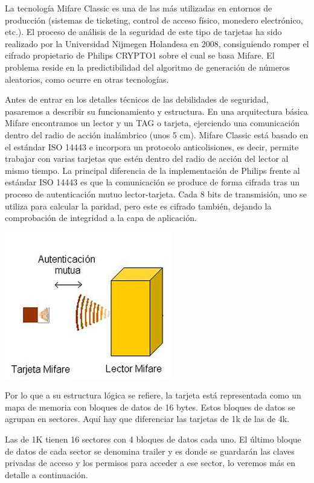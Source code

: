 La tecnología Mifare Classic es una de las más utilizadas en entornos de
producción (sistemas de ticketing, control de acceso físico, monedero
electrónico, etc.). El proceso de análisis de la seguridad de este tipo
de tarjetas ha sido realizado por la Universidad Nijmegen Holandesa en
2008, consiguiendo romper el cifrado propietario de Philips CRYPTO1
sobre el cual se basa Mifare. El problema reside en la predictibilidad
del algoritmo de generación de números aleatorios, como ocurre en otras
tecnologías.

Antes de entrar en los detalles técnicos de las debilidades de
seguridad, pasaremos a describir su funcionamiento y estructura. En una
arquitectura básica Mifare encontramos un lector y un TAG o tarjeta,
ejerciendo una comunicación dentro del radio de acción inalámbrico (unos
5 cm). Mifare Classic está basado en el estándar ISO 14443 e incorpora
un protocolo anticolisiones, es decir, permite trabajar con varias
tarjetas que estén dentro del radio de acción del lector al mismo
tiempo. La principal diferencia de la implementación de Philips frente
al estándar ISO 14443 es que la comunicación se produce de forma cifrada
tras un proceso de autenticación mutuo lector-tarjeta. Cada 8 bits de
transmisión, uno se utiliza para calcular la paridad, pero este es
cifrado también, dejando la comprobación de integridad a la capa de
aplicación.

\includegraphics{memoria/images/fig4-1.jpg}

Por lo que a su estructura lógica se refiere, la tarjeta está
representada como un mapa de memoria con bloques de datos de 16 bytes.
Estos bloques de datos se agrupan en sectores. Aquí hay que diferenciar
las tarjetas de 1k de las de 4k.

Las de 1K tienen 16 sectores con 4 bloques de datos cada uno. El último
bloque de datos de cada sector se denomina trailer y es donde se
guardarán las claves privadas de acceso y los permisos para acceder a
ese sector, lo veremos más en detalle a continuación.

